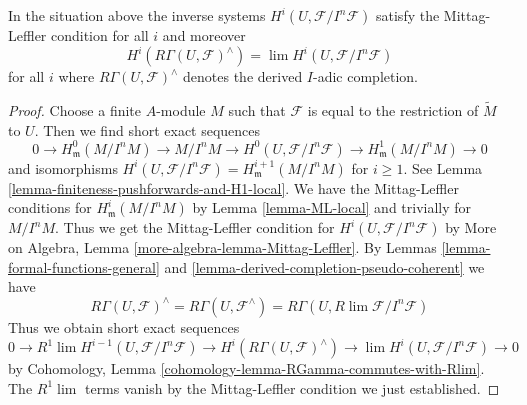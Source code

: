 \begin{lemma}
\label{lemma-compare-with-derived-completion}
In the situation above the inverse systems $H^i(U, \mathcal{F}/I^n\mathcal{F})$
satisfy the Mittag-Leffler condition for all $i$ and moreover
$$
H^i(R\Gamma(U, \mathcal{F})^\wedge) =
\lim H^i(U, \mathcal{F}/I^n\mathcal{F})
$$
for all $i$ where $R\Gamma(U, \mathcal{F})^\wedge$ denotes
the derived $I$-adic completion.
\end{lemma}

\begin{proof}
Choose a finite $A$-module $M$ such that $\mathcal{F}$ is equal to
the restriction of $\widetilde{M}$ to $U$. Then we find short exact sequences
$$
0 \to H^0_\mathfrak m(M/I^nM) \to M/I^nM \to
H^0(U, \mathcal{F}/I^n\mathcal{F}) \to H^1_\mathfrak m(M/I^nM) \to 0
$$
and isomorphisms
$H^i(U, \mathcal{F}/I^n\mathcal{F}) = H^{i + 1}_\mathfrak m(M/I^nM)$
for $i \geq 1$. See Lemma \ref{lemma-finiteness-pushforwards-and-H1-local}.
We have the Mittag-Leffler conditions for
$H^i_\mathfrak m(M/I^nM)$ by Lemma \ref{lemma-ML-local}
and trivially for $M/I^nM$. Thus we get the Mittag-Leffler condition for
$H^i(U, \mathcal{F}/I^n\mathcal{F})$ by
More on Algebra, Lemma \ref{more-algebra-lemma-Mittag-Leffler}.
By Lemmas \ref{lemma-formal-functions-general} and
\ref{lemma-derived-completion-pseudo-coherent} we have
$$
R\Gamma(U, \mathcal{F})^\wedge =
R\Gamma(U, \mathcal{F}^\wedge) =
R\Gamma(U, R\lim \mathcal{F}/I^n\mathcal{F})
$$
Thus we obtain short exact sequences
$$
0 \to R^1\lim H^{i - 1}(U, \mathcal{F}/I^n\mathcal{F}) \to
H^i(R\Gamma(U, \mathcal{F})^\wedge) \to
\lim H^i(U, \mathcal{F}/I^n\mathcal{F}) \to 0
$$
by Cohomology, Lemma \ref{cohomology-lemma-RGamma-commutes-with-Rlim}.
The $R^1\lim$ terms vanish by the Mittag-Leffler condition
we just established.
\end{proof}

